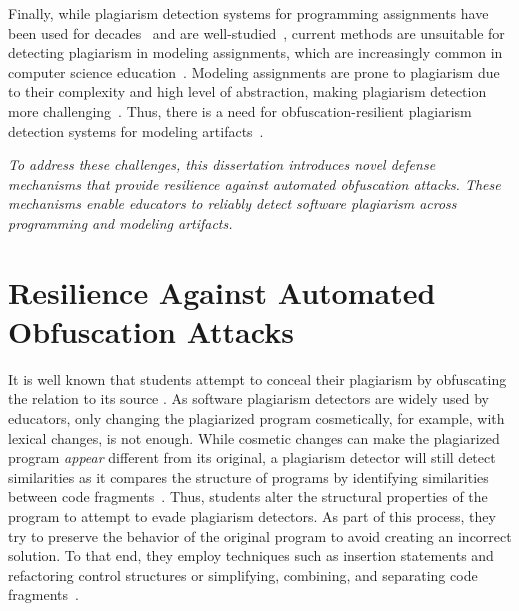 Finally, while plagiarism detection systems for programming assignments have been used for decades~\cite{Ottenstein1976} and are well-studied~\cite{Novak2019, Karnalim2019}, current methods are unsuitable for detecting plagiarism in modeling assignments, which are increasingly common in computer science education~\cite{Ciccozzi2018, Stahl2006, Engels2006}. Modeling assignments are prone to plagiarism due to their complexity and high level of abstraction, making plagiarism detection more challenging~\cite{Martinez2020}. Thus, there is a need for obfuscation-resilient plagiarism detection systems for modeling artifacts~\cite{Saglam2022}.

\textit{To address these challenges, this dissertation introduces novel defense mechanisms that provide resilience against automated obfuscation attacks. These mechanisms enable educators to reliably detect software plagiarism across programming and modeling artifacts.}

\section{Resilience Against Automated Obfuscation Attacks}
It is well known that students attempt to conceal their plagiarism by obfuscating the relation to its source \cite{Joy1999, Novak2020, Karnalim2016, Pawelczak2018}. As software plagiarism detectors are widely used by educators, only changing the plagiarized program cosmetically, for example, with lexical changes, is not enough. While cosmetic changes can make the plagiarized program \textit{appear} different from its original, a plagiarism detector will still detect similarities as it compares the structure of programs by identifying similarities between code fragments~\cite{Nichols2019}.
Thus, students alter the structural properties of the program to attempt to evade plagiarism detectors.
As part of this process, they try to preserve the behavior of the original program to avoid creating an incorrect solution.
To that end, they employ techniques such as insertion statements and refactoring control structures \cite{Karnalim2016} or simplifying, combining, and separating code fragments~\cite{Novak2019}.

